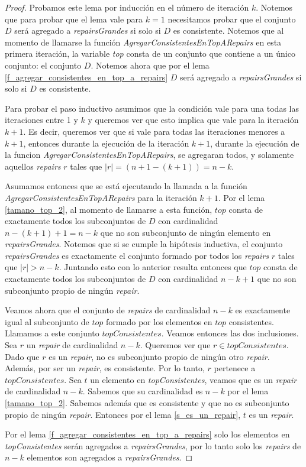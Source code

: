 \documentclass[11pt,a4paper,twoside]{tesis}
\begin{document}
\begin{proof}
Probamos este lema por inducción en el número de iteración $k$. Notemos que para probar que el lema vale para $k = 1$ necesitamos probar que el conjunto $D$ será agregado a \textit{repairsGrandes} si solo si $D$ es consistente. Notemos que al momento de llamarse la función \textit{AgregarConsistentesEnTopARepairs} en esta primera iteración, la variable \textit{top} consta de un conjunto que contiene a un único conjunto: el conjunto $D$. Notemos ahora que por el lema \ref{f_agregar_consistentes_en_top_a_repairs} $D$ será agregado a \textit{repairsGrandes} si solo si $D$ es consistente.

Para probar el paso inductivo asumimos que la condición vale para una todas las iteraciones entre 1 y $k$ y queremos ver que esto implica que vale para la iteración $k+1$. Es decir, queremos ver que si vale para todas las iteraciones menores a $k+1$, entonces durante la ejecución de la iteración $k+1$, durante la ejecución de la funcion \textit{AgregarConsistentesEnTopARepairs}, se agregaran todos, y solamente aquellos \textit{repairs} $r$ tales que $|r| = (n + 1 - (k+1)) = n - k$.


Asumamos entonces que se está ejecutando la llamada a la función \textit{AgregarConsistentesEnTopARepairs} para la iteración $k+1$. Por el lema \ref{tamano_top_2}, al momento de llamarse a esta función, $top$ consta de exactamente todos los subconjuntos de $D$ con cardinalidad $n - (k + 1) + 1 = n - k$ que no son subconjunto de ningún elemento en \textit{repairsGrandes}. Notemos que si se cumple la hipótesis inductiva, el conjunto \textit{repairsGrandes} es exactamente el conjunto formado por todos los \textit{repairs} $r$ tales que $|r| > n - k$. Juntando esto con lo anterior resulta entonces que $top$ consta de exactamente todos los subconjuntos de $D$ con cardinalidad $n - k + 1$ que no son subconjunto propio de ningún \textit{repair}. 

Veamos ahora que el conjunto de \textit{repairs} de cardinalidad $n-k$ es exactamente igual al subconjunto de $top$ formado por los elementos en $top$ consistentes. Llamamos a este conjunto $topConsistentes$. Veamos entonces las dos inclusiones.
Sea $r$ un \textit{repair} de cardinalidad $n-k$. Queremos ver que $r \in topConsistentes$. Dado que $r$ es un \textit{repair}, no es subconjunto propio de ningún otro \textit{repair}. Además, por ser un \textit{repair}, es consistente. Por lo tanto, $r$ pertenece a $topConsistentes$.
Sea $t$ un elemento en \textit{topConsistentes}, veamos que es un \textit{repair} de cardinalidad $n-k$. Sabemos que su cardinalidad es $n-k$ por el lema \ref{tamano_top_2}. Sabemos además que es consistente y que no es subconjunto propio de ningún \textit{repair}. Entonces por el lema \ref{s_es_un_repair}, $t$ es un \textit{repair}.

Por el lema \ref{f_agregar_consistentes_en_top_a_repairs} solo los elementos en \textit{topConsistentes} serán agregados a \textit{repairsGrandes}, por lo tanto solo los \textit{repairs} de $n-k$ elementos son agregados a \textit{repairsGrandes}.
\end{proof}
\end{document}
